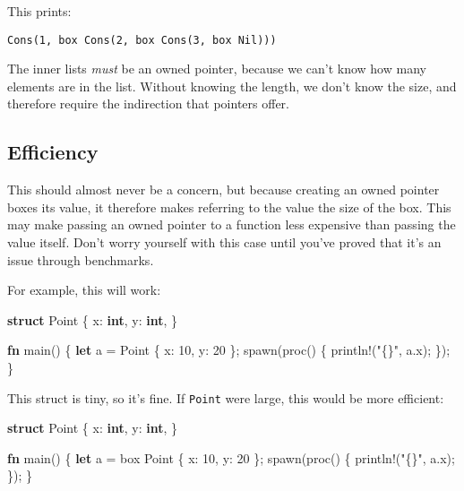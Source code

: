 \documentclass[]{article}
\newenvironment{Shaded}{}{}
\newcommand{\KeywordTok}[1]{\textcolor[rgb]{0.00,0.44,0.13}{\textbf{{#1}}}}
\newcommand{\DecValTok}[1]{\textcolor[rgb]{0.25,0.63,0.44}{{#1}}}
\newcommand{\StringTok}[1]{\textcolor[rgb]{0.25,0.44,0.63}{{#1}}}
\newcommand{\OtherTok}[1]{\textcolor[rgb]{0.00,0.44,0.13}{{#1}}}
\newcommand{\NormalTok}[1]{{#1}}
\begin{document}
This prints:

\begin{verbatim}
Cons(1, box Cons(2, box Cons(3, box Nil)))
\end{verbatim}

The inner lists \emph{must} be an owned pointer, because we can't know
how many elements are in the list. Without knowing the length, we don't
know the size, and therefore require the indirection that pointers
offer.

\subsection{Efficiency}\label{efficiency}

This should almost never be a concern, but because creating an owned
pointer boxes its value, it therefore makes referring to the value the
size of the box. This may make passing an owned pointer to a function
less expensive than passing the value itself. Don't worry yourself with
this case until you've proved that it's an issue through benchmarks.

For example, this will work:

\begin{Shaded}
\begin{Highlighting}[]
\KeywordTok{struct} \NormalTok{Point \{}
    \NormalTok{x: }\KeywordTok{int}\NormalTok{,}
    \NormalTok{y: }\KeywordTok{int}\NormalTok{,}
\NormalTok{\}}

\KeywordTok{fn} \NormalTok{main() \{}
    \KeywordTok{let} \NormalTok{a = Point \{ x: }\DecValTok{10}\NormalTok{, y: }\DecValTok{20} \NormalTok{\};}
    \NormalTok{spawn(proc() \{}
        \OtherTok{println!}\NormalTok{(}\StringTok{"\{\}"}\NormalTok{, a.x);}
    \NormalTok{\});}
\NormalTok{\}}
\end{Highlighting}
\end{Shaded}

This struct is tiny, so it's fine. If \texttt{Point} were large, this
would be more efficient:

\begin{Shaded}
\begin{Highlighting}[]
\KeywordTok{struct} \NormalTok{Point \{}
    \NormalTok{x: }\KeywordTok{int}\NormalTok{,}
    \NormalTok{y: }\KeywordTok{int}\NormalTok{,}
\NormalTok{\}}

\KeywordTok{fn} \NormalTok{main() \{}
    \KeywordTok{let} \NormalTok{a = box Point \{ x: }\DecValTok{10}\NormalTok{, y: }\DecValTok{20} \NormalTok{\};}
    \NormalTok{spawn(proc() \{}
        \OtherTok{println!}\NormalTok{(}\StringTok{"\{\}"}\NormalTok{, a.x);}
    \NormalTok{\});}
\NormalTok{\}}
\end{Highlighting}
\end{Shaded}
\end{document}
